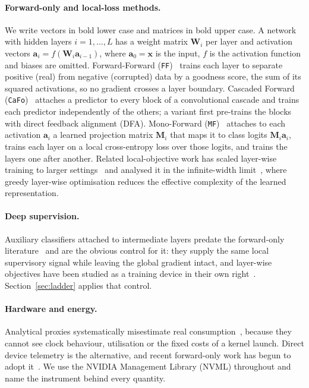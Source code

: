 \documentclass{llncs}
\newcommand{\FF}{\texttt{FF}}
\newcommand{\MF}{\texttt{MF}}
\newcommand{\CaFo}{\texttt{CaFo}}
\begin{document}
\paragraph{Forward-only and local-loss methods.}
We write vectors in bold lower case and matrices in bold upper case. A network
with hidden layers $i = 1, \ldots, L$ has a weight matrix $\mathbf{W}_i$ per
layer and activation vectors $\mathbf{a}_i = f(\mathbf{W}_i \mathbf{a}_{i-1})$,
where $\mathbf{a}_0 = \mathbf{x}$ is the input, $f$ is the activation function
and biases are omitted. Forward-Forward (\FF{})~\cite{hinton2022forward}
trains each layer to separate positive (real) from negative (corrupted) data
by a goodness score, the sum of its squared activations, so no gradient
crosses a layer boundary. Cascaded Forward (\CaFo{})~\cite{zhao2023cafo}
attaches a predictor to every block of a convolutional cascade and trains each
predictor independently of the others; a variant first pre-trains the blocks
with direct feedback alignment (DFA). Mono-Forward (\MF{})~\cite{gong2025mono}
attaches to each activation $\mathbf{a}_i$ a learned projection matrix $\mathbf{M}_i$ that maps it to
class logits $\mathbf{M}_i \mathbf{a}_i$, trains each layer on a local
cross-entropy loss over those logits, and trains the layers one after another.
Related local-objective work has scaled layer-wise training to larger
settings~\cite{ren2023scaling} and analysed it in the infinite-width
limit~\cite{ishikawa2025local}, where greedy layer-wise optimisation reduces
the effective complexity of the learned representation.

\paragraph{Deep supervision.}
Auxiliary classifiers attached to intermediate layers predate the forward-only
literature~\cite{lee2015deeply} and are the obvious control for it: they supply
the same local supervisory signal while leaving the global gradient intact,
and layer-wise objectives have been studied as a training device in their own
right~\cite{lorberbom2024layer}. Section~\ref{sec:ladder} applies that control.

\paragraph{Hardware and energy.}
Analytical proxies systematically misestimate real
consumption~\cite{desislavov2024energy,abbas2024impact}, because they cannot
see clock behaviour, utilisation or the fixed costs of a kernel launch.
Direct device telemetry is the alternative, and recent forward-only work has
begun to adopt it~\cite{papachristodoulou2024convolutional}. We use the NVIDIA
Management Library (NVML) throughout and name the instrument behind every
quantity.
\end{document}
